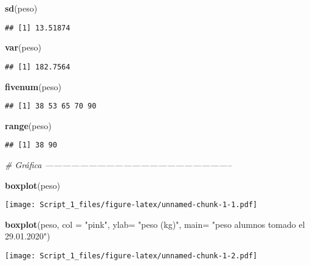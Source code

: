 \documentclass[
]{article}
\newenvironment{Shaded}{\begin{snugshade}}{\end{snugshade}}
\newcommand{\CommentTok}[1]{\textcolor[rgb]{0.56,0.35,0.01}{\textit{#1}}}
\newcommand{\DataTypeTok}[1]{\textcolor[rgb]{0.13,0.29,0.53}{#1}}
\newcommand{\KeywordTok}[1]{\textcolor[rgb]{0.13,0.29,0.53}{\textbf{#1}}}
\newcommand{\NormalTok}[1]{#1}
\newcommand{\StringTok}[1]{\textcolor[rgb]{0.31,0.60,0.02}{#1}}
\begin{document}
\begin{Shaded}
\begin{Highlighting}[]
 \KeywordTok{sd}\NormalTok{(peso) }
\end{Highlighting}
\end{Shaded}

\begin{verbatim}
## [1] 13.51874
\end{verbatim}

\begin{Shaded}
\begin{Highlighting}[]
 \KeywordTok{var}\NormalTok{(peso) }
\end{Highlighting}
\end{Shaded}

\begin{verbatim}
## [1] 182.7564
\end{verbatim}

\begin{Shaded}
\begin{Highlighting}[]
 \KeywordTok{fivenum}\NormalTok{(peso)}
\end{Highlighting}
\end{Shaded}

\begin{verbatim}
## [1] 38 53 65 70 90
\end{verbatim}

\begin{Shaded}
\begin{Highlighting}[]
 \KeywordTok{range}\NormalTok{(peso)}
\end{Highlighting}
\end{Shaded}

\begin{verbatim}
## [1] 38 90
\end{verbatim}

\begin{Shaded}
\begin{Highlighting}[]
\CommentTok{# Gráfica -----------------------------------------------------------------}

 \KeywordTok{boxplot}\NormalTok{(peso)}
\end{Highlighting}
\end{Shaded}

\texttt{[image: Script\_1\_files/figure-latex/unnamed-chunk-1-1.pdf]}

\begin{Shaded}
\begin{Highlighting}[]
 \KeywordTok{boxplot}\NormalTok{(peso, }\DataTypeTok{col =} \StringTok{"pink"}\NormalTok{, }\DataTypeTok{ylab=} \StringTok{"peso (kg)"}\NormalTok{,}
         \DataTypeTok{main=} \StringTok{"peso alumnos tomado el 29.01.2020"}\NormalTok{)}
\end{Highlighting}
\end{Shaded}

\texttt{[image: Script\_1\_files/figure-latex/unnamed-chunk-1-2.pdf]}
\end{document}
